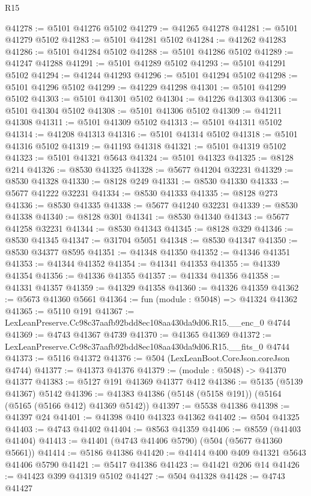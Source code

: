 \begin{lexlean}{R15}
\begin{coremodule}
{{{{{{{{{{{@41278 := @5101 @41276 @5102
@41279 := @41265 @41278
@41281 := @5101 @41279 @5102
@41283 := @5101 @41281 @5102
@41284 := @41262 @41283
@41286 := @5101 @41284 @5102
@41288 := @5101 @41286 @5102
@41289 := @41247 @41288
@41291 := @5101 @41289 @5102
@41293 := @5101 @41291 @5102
@41294 := @41244 @41293
@41296 := @5101 @41294 @5102
@41298 := @5101 @41296 @5102
@41299 := @41229 @41298
@41301 := @5101 @41299 @5102
@41303 := @5101 @41301 @5102
@41304 := @41226 @41303
@41306 := @5101 @41304 @5102
@41308 := @5101 @41306 @5102
@41309 := @41211 @41308
@41311 := @5101 @41309 @5102
@41313 := @5101 @41311 @5102
@41314 := @41208 @41313
@41316 := @5101 @41314 @5102
@41318 := @5101 @41316 @5102
@41319 := @41193 @41318
@41321 := @5101 @41319 @5102
@41323 := @5101 @41321 @5643
@41324 := @5101 @41323
@41325 := @8128 @214
@41326 := @8530 @41325
@41328 := @5677 @41204 @32231
@41329 := @8530 @41328
@41330 := @8128 @249
@41331 := @8530 @41330
@41333 := @5677 @41222 @32231
@41334 := @8530 @41333
@41335 := @8128 @273
@41336 := @8530 @41335
@41338 := @5677 @41240 @32231
@41339 := @8530 @41338
@41340 := @8128 @301
@41341 := @8530 @41340
@41343 := @5677 @41258 @32231
@41344 := @8530 @41343
@41345 := @8128 @329
@41346 := @8530 @41345
@41347 := @31704 @5051
@41348 := @8530 @41347
@41350 := @8530 @34377 @8595
@41351 := @41348 @41350
@41352 := @41346 @41351
@41353 := @41344 @41352
@41354 := @41341 @41353
@41355 := @41339 @41354
@41356 := @41336 @41355
@41357 := @41334 @41356
@41358 := @41331 @41357
@41359 := @41329 @41358
@41360 := @41326 @41359
@41362 := @5673 @41360 @5661
@41364 := fun (module : @5048) => @41324 @41362
@41365 := @5110 @191
@41367 := LexLeanPreserve.Cc98c37aafb92bdd8ec108aa430da9d06.R15.__enc_0 @4744
@41369 := @4743 @41367 @4739
@41370 := @41365 @41369
@41372 := LexLeanPreserve.Cc98c37aafb92bdd8ec108aa430da9d06.R15.__fits_0 @4744
@41373 := @5116 @41372
@41376 := @504 (LexLeanBoot.CoreJson.coreJson @4744)
@41377 := @41373 @41376
@41379 := (module : @5048) -> @41370 @41377
@41383 := @5127 @191 @41369 @41377 @412
@41386 := @5135 (@5139 @41367) @5142
@41396 := @41383 @41386 (@5148 (@5158 @191)) (@5164 (@5165 (@5166 @412) @41369 @5142))
@41397 := @5538 @41386
@41398 := @41397 @24
@41401 := @41398 @410 @41323 @41362
@41402 := @504 @41325
@41403 := @4743 @41402
@41404 := @8563 @41359
@41406 := @8559 (@41403 @41404)
@41413 := @41401 (@4743 @41406 @5790) (@504 (@5677 @41360 @5661))
@41414 := @5186 @41386
@41420 := @41414 @400 @409 @41321 @5643 @41406 @5790
@41421 := @5417 @41386
@41423 := @41421 @206 @14
@41426 := @41423 @399 @41319 @5102
@41427 := @504 @41328
@41428 := @4743 @41427
}}}}}}}}}}}
\end{coremodule}
\end{lexlean}
